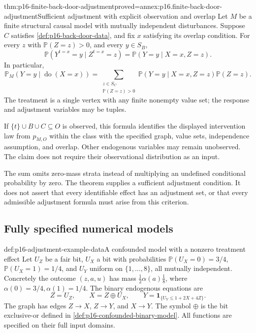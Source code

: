 \begin{hbtheorem}{thm:p16-finite-back-door-adjustment}{proved=annex:p16.finite-back-door-adjustment}{Sufficient adjustment with explicit observation and overlap}
Let \(M\) be a finite structural causal model with mutually independent
disturbances. Suppose \(C\) satisfies \cref{def:p16-back-door-data},
and fix \(x\) satisfying its overlap condition. For every
\(z\) with \(\mathbb P(Z=z)>0\), and every \(y\in S_B\),
\[
 \mathbb P(Y^{t=x}=y\mid Z^{t=x}=z)
       =\mathbb P(Y=y\mid X=x,Z=z).
\]
In particular,
\[
 \mathbb P_M(Y=y\mid\operatorname{do}(X=x))
 =\sum_{\substack{z\in S_C\\\mathbb P(Z=z)>0}}
       \mathbb P(Y=y\mid X=x,Z=z)\mathbb P(Z=z).
\]
The treatment is a single vertex with any
finite nonempty value set; the response and adjustment variables may
be tuples.

If \(\{t\}\cup B\cup C\subseteq O\) is observed, this formula
identifies the displayed intervention law from \(p_{M,O}\) within
the class with the specified graph, value sets, independence assumption,
and overlap. Other endogenous variables may remain unobserved. The
claim does not require their observational distribution as an input.
\end{hbtheorem}

The sum omits zero-mass strata instead of multiplying an undefined
conditional probability by zero. The theorem supplies a sufficient
adjustment condition. It does not assert that every identifiable effect
has an adjustment set, or that every admissible adjustment formula must
arise from this criterion.

\subsection{Fully specified numerical models}

\begin{hbdefinition}{def:p16-adjustment-example-data}{A confounded model with a nonzero treatment effect}
Let \(U_Z\) be a fair bit, \(U_X\) a bit with probabilities
\(\mathbb P(U_X=0)=3/4\), \(\mathbb P(U_X=1)=1/4\), and
\(U_Y\) uniform on \(\{1,\ldots,8\}\), all mutually independent.
Concretely the outcome \((z,a,u)\) has mass
\(\frac12\alpha(a)\frac18\), where
\(\alpha(0)=3/4,\alpha(1)=1/4\).
The binary endogenous equations are
\[
 Z=U_Z,\qquad X=Z\oplus U_X,\qquad
 Y=\mathbf1_{\{U_Y\leq1+2X+4Z\}}.
\]
The graph has edges \(Z\to X\), \(Z\to Y\), and \(X\to Y\).
The symbol \(\oplus\) is the bit exclusive-or defined in
\cref{def:p16-confounded-binary-model}. All functions are specified
on their full input domains.
\end{hbdefinition}

